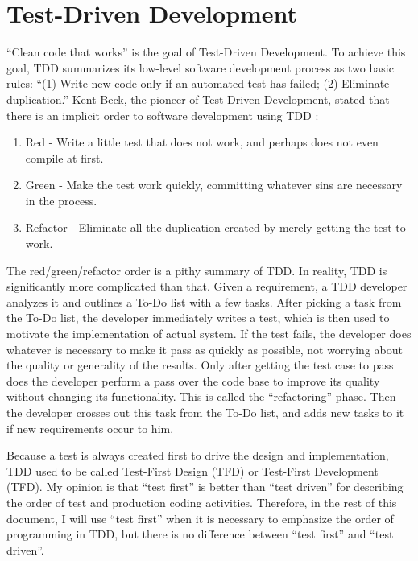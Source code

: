 \section{Test-Driven Development}
``Clean code that works''\cite{Beck:03} is the goal of Test-Driven Development. To achieve this goal, TDD summarizes its low-level software development process as two basic rules: ``(1) Write new code only if an automated test has failed; (2) Eliminate duplication.''  Kent Beck, the pioneer of Test-Driven Development, stated that there is an implicit order to software development using TDD \cite{Beck:03}: 
\begin{enumerate}
\item Red - Write a little test that does not work, and perhaps does not even compile at first.
\item Green - Make the test work quickly, committing whatever sins are necessary in the process.
\item Refactor - Eliminate all the duplication created by merely getting the test to work.
\end{enumerate}

The red/green/refactor order is a pithy summary of TDD. In reality, TDD is significantly more complicated than that. Given a requirement, a TDD developer analyzes it and outlines a To-Do list with a few tasks. After picking a task from the To-Do list, the developer immediately writes a test, which is then used to motivate the implementation of actual system. If the test fails, the developer does whatever is necessary to make it pass as quickly as possible, not worrying about the quality or generality of the results. Only after getting the test case to pass does the developer perform a pass over the code base to improve its quality without changing its functionality. This is called the ``refactoring'' phase. Then the developer crosses out this task from the To-Do list, and adds new tasks to it if new requirements occur to him. 

Because a test is always created first to drive the design and implementation, TDD used to be called Test-First Design (TFD) or Test-First Development (TFD). My opinion is that ``test first'' is better than ``test driven'' for describing the order of test and production coding activities. Therefore, in the rest of this document, I will use ``test first'' when it is necessary to emphasize the order of programming in TDD, but there is no difference between ``test first'' and ``test driven''.

